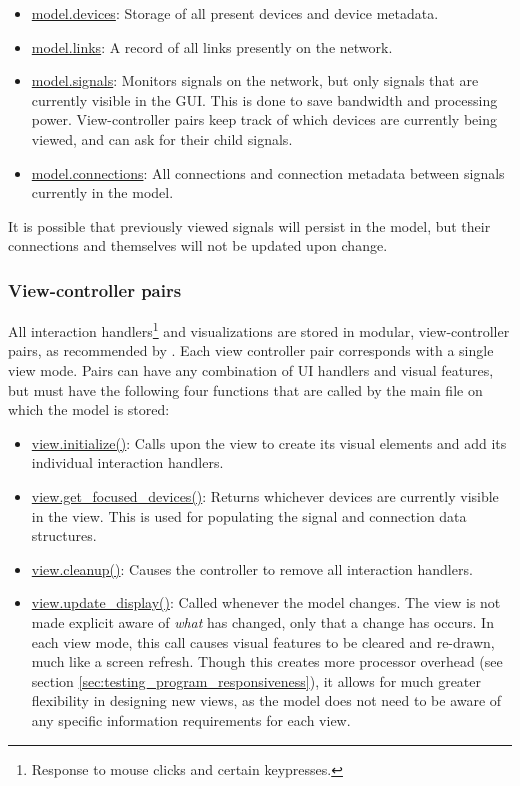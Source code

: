 \begin{itemize}
 	\item \url{model.devices}: Storage of all present devices and device metadata.
 	\item \url{model.links}: A record of all links presently on the network.
 	\item \url{model.signals}: Monitors signals on the network, but only signals that are currently visible in the GUI. This is done to save bandwidth and processing power. View-controller pairs keep track of which devices are currently being viewed, and can ask for their child signals. 
 	\item \url{model.connections}: All connections and connection metadata between signals currently in the model.
 \end{itemize} 

It is possible that previously viewed signals will persist in the model, but their connections and themselves will not be updated upon change.

		\subsubsection{View-controller pairs}

All interaction handlers\footnote{Response to mouse clicks and certain keypresses.} and visualizations are stored in modular, view-controller pairs, as recommended by . Each view controller pair corresponds with a single view mode. Pairs can have any combination of UI handlers and visual features, but must have the following four functions that are called by the main file on which the model is stored:

\begin{itemize}
	\item \url{view.initialize()}: Calls upon the view to create its visual elements and add its individual interaction handlers.
	\item \url{view.get_focused_devices()}: Returns whichever devices are currently visible in the view. This is used for populating the signal and connection data structures.
	\item \url{view.cleanup()}: Causes the controller to remove all interaction handlers.
	\item \url{view.update_display()}: Called whenever the model changes. The view is not made explicit aware of \emph{what} has changed, only that a change has occurs. In each view mode, this call causes visual features to be cleared and re-drawn, much like a screen refresh. Though this creates more processor overhead (see section \ref{sec:testing_program_responsiveness}), it allows for much greater flexibility in designing new views, as the model does not need to be aware of any specific information requirements for each view.
\end{itemize}

